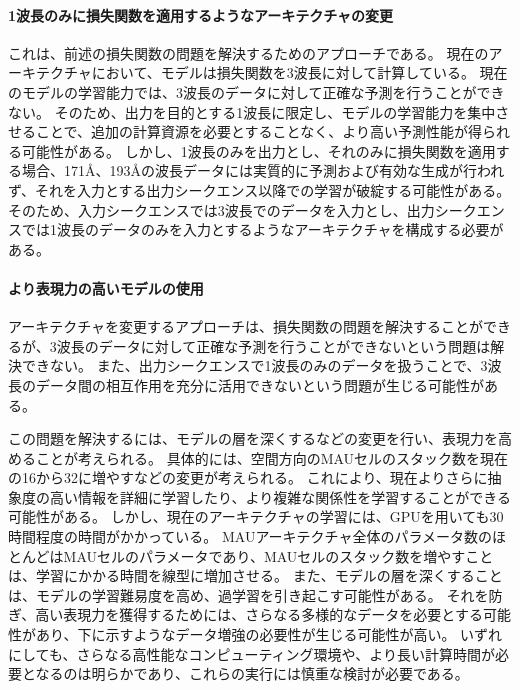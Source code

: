         \paragraph{1波長のみに損失関数を適用するようなアーキテクチャの変更}
          これは、前述の損失関数の問題を解決するためのアプローチである。
          現在のアーキテクチャにおいて、モデルは損失関数を3波長に対して計算している。
          現在のモデルの学習能力では、3波長のデータに対して正確な予測を行うことができない。
          そのため、出力を目的とする1波長に限定し、モデルの学習能力を集中させることで、追加の計算資源を必要とすることなく、より高い予測性能が得られる可能性がある。
          しかし、1波長のみを出力とし、それのみに損失関数を適用する場合、171Å、193Åの波長データには実質的に予測および有効な生成が行われず、それを入力とする出力シークエンス以降での学習が破綻する可能性がある。
          そのため、入力シークエンスでは3波長でのデータを入力とし、出力シークエンスでは1波長のデータのみを入力とするようなアーキテクチャを構成する必要がある。

        \paragraph{より表現力の高いモデルの使用}
          アーキテクチャを変更するアプローチは、損失関数の問題を解決することができるが、3波長のデータに対して正確な予測を行うことができないという問題は解決できない。
          また、出力シークエンスで1波長のみのデータを扱うことで、3波長のデータ間の相互作用を充分に活用できないという問題が生じる可能性がある。
          
          この問題を解決するには、モデルの層を深くするなどの変更を行い、表現力を高めることが考えられる。
          具体的には、空間方向のMAUセルのスタック数を現在の16から32に増やすなどの変更が考えられる。
          これにより、現在よりさらに抽象度の高い情報を詳細に学習したり、より複雑な関係性を学習することができる可能性がある。
          しかし、現在のアーキテクチャの学習には、GPUを用いても30時間程度の時間がかかっている。
          MAUアーキテクチャ全体のパラメータ数のほとんどはMAUセルのパラメータであり、MAUセルのスタック数を増やすことは、学習にかかる時間を線型に増加させる。
          また、モデルの層を深くすることは、モデルの学習難易度を高め、過学習を引き起こす可能性がある。
          それを防ぎ、高い表現力を獲得するためには、さらなる多様的なデータを必要とする可能性があり、下に示すようなデータ増強の必要性が生じる可能性が高い。
          いずれにしても、さらなる高性能なコンピューティング環境や、より長い計算時間が必要となるのは明らかであり、これらの実行には慎重な検討が必要である。

